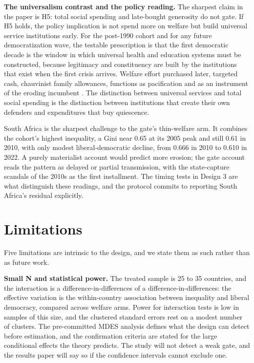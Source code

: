 \textbf{The universalism contrast and the policy reading.} The sharpest claim in the paper is H5: total social spending and late-bought generosity do not gate. If H5 holds, the policy implication is not spend more on welfare but build universal service institutions early. For the post-1990 cohort and for any future democratization wave, the testable prescription is that the first democratic decade is the window in which universal health and education systems must be constructed, because legitimacy and constituency are built by the institutions that exist when the first crisis arrives. Welfare effort purchased later, targeted cash, chauvinist family allowances, functions as pacification \citep{Vanhuysse2006} and as an instrument of the eroding incumbent \citep{SzikraOktem2023, LendvaiBainton2021, Benczes2024}. The distinction between universal services and total social spending is the distinction between institutions that create their own defenders \citep{Pierson1993, SossSchram2007, RothsteinUslaner2005, KorpiPalme1998} and expenditures that buy quiescence.

South Africa is the sharpest challenge to the gate's thin-welfare arm. It combines the cohort's highest inequality, a Gini near 0.65 at its 2005 peak and still 0.61 in 2010, with only modest liberal-democratic decline, from 0.666 in 2010 to 0.610 in 2022. A purely materialist account would predict more erosion; the gate account reads the pattern as delayed or partial transmission, with the state-capture scandals of the 2010s as the first installment. The timing tests in Design 3 are what distinguish these readings, and the protocol commits to reporting South Africa's residual explicitly.

\section{Limitations}

Five limitations are intrinsic to the design, and we state them as such rather than as future work.

\textbf{Small N and statistical power.} The treated sample is 25 to 35 countries, and the interaction is a difference-in-differences of a difference-in-differences: the effective variation is the within-country association between inequality and liberal democracy, compared across welfare arms. Power for interaction tests is low in samples of this size, and the clustered standard errors rest on a modest number of clusters. The pre-committed MDES analysis defines what the design can detect before estimation, and the confirmation criteria are stated for the large conditional effects the theory predicts. The study will not detect a weak gate, and the results paper will say so if the confidence intervals cannot exclude one.

